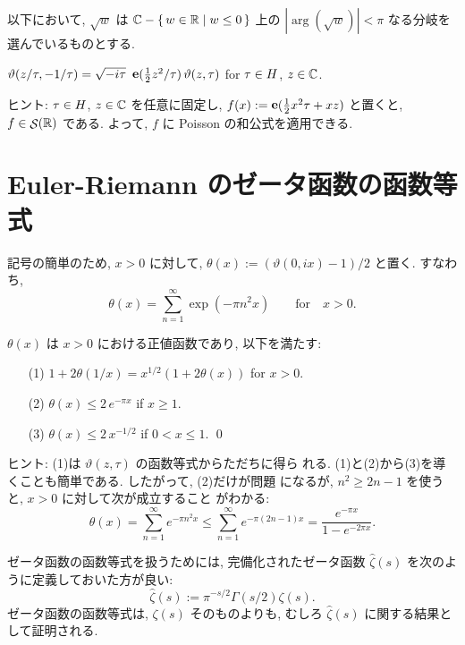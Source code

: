\documentclass[12pt,twoside]{jarticle}
\begin{document}
以下において, $\sqrt{w}$ は ${\mathbb C} - \{\,w\in{\mathbb R}\mid w \le 0\,\}$ 上の 
$|\arg(\sqrt{w})| < \pi$ なる分岐を選んでいるものとする. 

\begin{question}[テータ函数の函数等式]\qstar{*}
  \(
    \vartheta(z/\tau, -1/\tau)
    = \sqrt{-i\tau}
      \,\, \mathop{\mathbf{e}}\nolimits(\frac{1}{2} z^2/\tau)
      \, \vartheta(z,\tau)
  \)
  \quad
  for $\tau\in H$, $z\in{\mathbb C}$.
\end{question}

\noindent ヒント: $\tau\in H$, $z\in{\mathbb C}$ を任意に固定し, %
$f(x) := \mathop{\mathbf{e}}\nolimits(\frac{1}{2}x^2\tau + xz)$ と置くと, $f\in\mathop{\mathcal{S}}\nolimits({\mathbb R})$ である. 
よって, $f$ に Poisson の和公式を適用できる. 


\section{Euler-Riemann のゼータ函数の函数等式}

記号の簡単のため, $x>0$ に対して, $\theta(x):=(\vartheta(0,ix)-1)/2$ 
と置く. すなわち,
\[
  \theta(x) = \sum_{n=1}^\infty \exp(- \pi n^2 x)
  \qquad\text{for}\quad x > 0.
\]%

\begin{question}\label{q:Theta-junbi}\qstar{*}
  $\theta(x)$ は $x > 0$ における正値函数であり, 以下を満たす:
  \begin{enumerate}
  \item[(1)]
    $1 + 2\theta(1/x) = x^{1/2} (1 + 2\theta(x))$ \quad for $x > 0$.
  \item[(2)]
    $\theta(x) \le 2 \, e^{- \pi x}$ \quad if $x \ge 1$.
  \item[(3)]
    $\theta(x) \le 2 \, x^{-1/2}$    \enspace if $0 < x \le 1$.
  \qed
  \end{enumerate}
\end{question}

\noindent ヒント: (1)は $\vartheta(z,\tau)$ の函数等式からただちに得ら
れる. (1)と(2)から(3)を導くことも簡単である. したがって, (2)だけが問題
になるが, $n^2 \ge 2n - 1$ を使うと, $x > 0$ に対して次が成立すること
がわかる:
\[
  \theta(x)
  =
  \sum_{n=1}^\infty e^{-\pi n^2 x}
  \le
  \sum_{n=1}^\infty e^{-\pi(2n - 1)x}
  =
  \frac{e^{-\pi x}}{1 - e^{-2\pi x}}.
\]%

ゼータ函数の函数等式を扱うためには, 完備化されたゼータ函数 %
$\hat\zeta(s)$ を次のように定義しておいた方が良い:
\[
  \hat\zeta(s) := \pi^{-s/2} \Gamma(s/2) \zeta(s).
\]%
ゼータ函数の函数等式は, $\zeta(s)$ そのものよりも, むしろ 
$\hat\zeta(s)$ に関する結果として証明される. 
\end{document}
